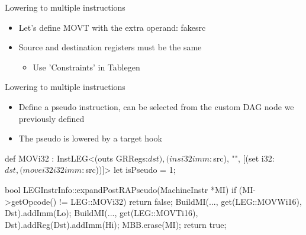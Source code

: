 
\begin{frame}[fragile]{Lowering to multiple instructions}

\begin{itemize}
    \item Let's define MOVT with the extra operand: fakesrc
    \item Source and destination registers must be the same
    \begin{itemize}
        \item Use 'Constraints' in Tablegen
    \end{itemize}
\end{itemize}


\end{frame}


\begin{frame}[fragile]{Lowering to multiple instructions}

\begin{itemize}
    \item Define a pseudo instruction, can be selected from the custom DAG node we previously defined
    \item The pseudo is lowered by a target hook
\end{itemize}

\begin{codebox}
def MOVi32 : InstLEG<(outs GRRegs:$dst), (ins i32imm:$src), "",
                     [(set i32:$dst, (movei32 i32imm:$src))]> {
  let isPseudo = 1;
}
\end{codebox}

\begin{codebox}
bool LEGInstrInfo::expandPostRAPseudo(MachineInstr *MI) {
   if (MI->getOpcode() != LEG::MOVi32) return false;
   BuildMI(..., get(LEG::MOVWi16), Dst).addImm(Lo);
   BuildMI(..., get(LEG::MOVTi16), Dst).addReg(Dst).addImm(Hi);
   MBB.erase(MI);
   return true;
}
\end{codebox}

\end{frame}


